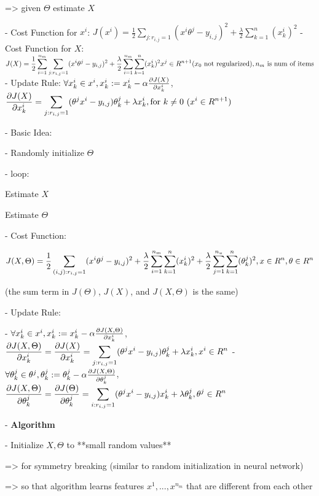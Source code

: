 => given $\Theta$ estimate $X$ 

- Cost Function for $x^i$: $\displaystyle J(x^i)=\frac 1 2 \sum_{j:r_{i,j}=1} (x^i\theta^j - y_{i,j})^2 + \frac \lambda 2 \sum ^n_{k=1} (x_k^i)^2$ 
- Cost Function for $X$: $\displaystyle J(X)=\frac 1 2 \sum_{i=1}^{n_m} \sum_{j:r_{i,j}=1} (x^i\theta^j - y_{i,j})^2 + \frac \lambda 2 \sum_{i=1}^{n_m} \sum ^n_{k=1} (x_k^i)^2 \\ x^j \in R^{n+1} (x_0 \text{ not regularized)}, \space n_m \text{ is num of items}$ 
- Update Rule: \(\forall x^i_k \in x^i, x^i_k := x^i_k-\alpha\large\frac{\partial J(X)}{\partial x^i_k}\), \(\displaystyle \frac{\partial J(X)}{\partial x^i_k}=\sum_{j:r_{i,j}=1}(\theta^jx^i-y_{i,j})\theta_k^j+ \lambda x_k^i, \space \text{for $k \neq 0$ $(x^i \in R^{n+1}$)}\)

- Basic Idea: 

- Randomly initialize $\Theta$ 

- loop:

	Estimate $X$ 

	Estimate $\Theta$ 

- Cost Function: 

$\displaystyle J(X,\Theta) = \frac 1 2 \sum_{(i,j):r_{i,j}=1}(x^i\theta^j - y_{i,j})^2 + \frac \lambda 2 \sum_{i=1}^{n_m}\sum_{k=1}^n(x_k^i)^2 + \frac \lambda 2 \sum_{j=1}^{n_u}\sum_{k=1}^n (\theta_k^j)^2, \space x \in R^n, \space \theta \in R^n$ 

(the sum term in $J(\Theta)$, $J(X)$, and $J(X,\Theta)$ is the same)

- Update Rule: 

- $\forall x^i_k \in x^i, x^i_k := x^i_k-\alpha\large\frac{\partial J(X,\Theta)}{\partial x^i_k}$, $\displaystyle \frac{\partial J(X,\Theta)}{\partial x^i_k} = \frac{\partial J(X)}{\partial x^i_k} =\sum_{j:r_{i,j}=1}(\theta^jx^i-y_{i,j})\theta_k^j+ \lambda x_k^i, \space x^i \in R^n$ 
- $\forall \theta^j_k \in \theta^j, \theta^j_k := \theta^j_k-\alpha\large\frac{\partial J(X,\Theta)}{\partial\theta^j_k}$, $\displaystyle \frac{\partial J(X,\Theta)}{\partial\theta^j_k} = \frac{\partial J(\Theta)}{\partial\theta^j_k} = \sum_{i:r_{i,j}=1}(\theta^jx^i-y_{i,j})x_k^i+ \lambda \theta_k^j, \space \theta^j \in R^n$ 

- \textbf{Algorithm}

- Initialize $X, \Theta$ to **small random values**

=> for symmetry breaking (similar to random initialization in neural network) 

=> so that algorithm learns features $x^1,...,x^{n_m}$ that are different from each other

